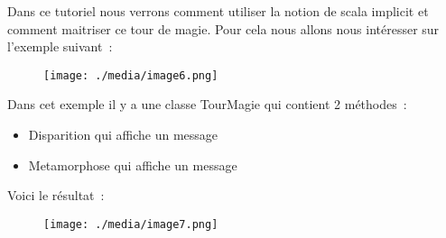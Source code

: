\documentclass[12pt]{article}
\begin{document}
\vspace{\baselineskip}
Dans ce tutoriel nous verrons comment utiliser la notion de scala implicit et comment maitriser ce tour de magie. Pour cela nous allons nous intéresser sur l’exemple suivant :\par


\vspace{\baselineskip}

\vspace{\baselineskip}



\begin{figure}[H]
	\begin{Center}
		\texttt{[image: ./media/image6.png]}
	\end{Center}
\end{figure}



\par


\vspace{\baselineskip}

\vspace{\baselineskip}
Dans cet exemple il y a une classe TourMagie qui contient 2 méthodes : \par

\begin{itemize}
	\item Disparition qui affiche un message\par

	\item Metamorphose qui affiche un message
\end{itemize}\par


\vspace{\baselineskip}

\vspace{\baselineskip}
 Voici le résultat : \par


\vspace{\baselineskip}



\begin{figure}[H]
	\begin{Center}
		\texttt{[image: ./media/image7.png]}
	\end{Center}
\end{figure}
\end{document}
